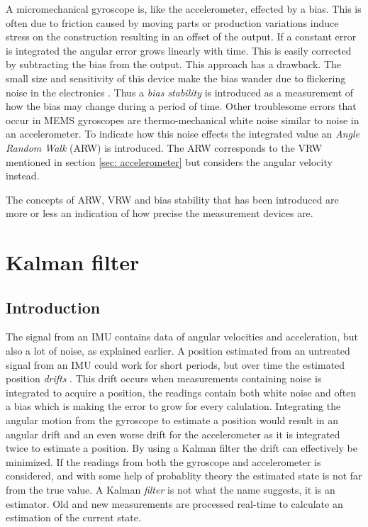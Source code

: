\documentclass[a4paper,11pt]{kth-mag}
\begin{document}
A micromechanical gyroscope is, like the accelerometer, effected by a bias. This is often due to friction caused by moving parts or production variations induce stress on the construction resulting in an offset of the output. If a constant error is integrated the angular error grows linearly with time. This is easily corrected by subtracting the bias from the output.
This approach has a drawback. The small size and sensitivity of this device make the bias wander due to flickering noise in the electronics \cite{IMUintro}. Thus a \textit{bias stability} is introduced as a measurement of how the bias may change during a period of time.
Other troublesome errors that occur in MEMS gyroscopes are thermo-mechanical white noise similar to noise in an accelerometer. To indicate how this noise effects the integrated value an \textit{Angle Random Walk} (ARW) is introduced. The ARW corresponds to the VRW mentioned in section \ref{sec: accelerometer} but considers the angular velocity instead.

The concepts of ARW, VRW and bias stability that has been introduced are more or less an indication of how precise the measurement devices are.

\section{Kalman filter} \label{section: Kalman}
\subsection{Introduction}
The signal from an IMU contains data of angular velocities and acceleration, but also a lot of noise, as explained earlier. A position estimated from an untreated signal from an IMU could work for short periods, but over time the estimated position \textit{drifts} \cite{MEMSdrift}. This drift occurs when measurements containing noise is integrated to acquire a position, the readings contain both white noise and often a bias which is making the  error to grow for every calulation.
Integrating the angular motion from the gyroscope to estimate a position would result in an angular drift and an even worse drift for the accelerometer as it is integrated twice to estimate a position.
By using a Kalman filter the drift can effectively be minimized. If the readings from both the gyroscope and accelerometer is considered, and with some help of probablity theory the estimated state is not far from the true value.  A Kalman \textit{filter} is not what the name suggests, it is an estimator. Old and new measurements are processed real-time to calculate an estimation of the current state. 
\end{document}
